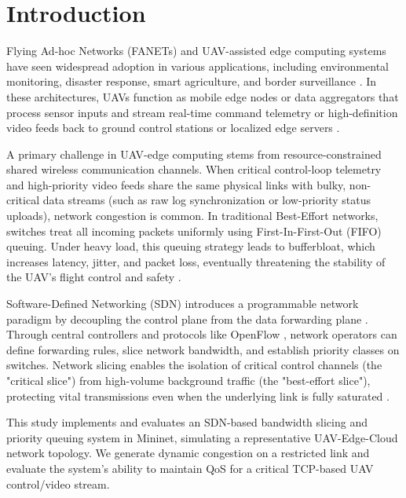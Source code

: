 \documentclass[conference]{IEEEtran}
\begin{document}
\section{Introduction}
Flying Ad-hoc Networks (FANETs) and UAV-assisted edge computing systems have seen widespread adoption in various applications, including environmental monitoring, disaster response, smart agriculture, and border surveillance \cite{b7}. In these architectures, UAVs function as mobile edge nodes or data aggregators that process sensor inputs and stream real-time command telemetry or high-definition video feeds back to ground control stations or localized edge servers \cite{b8}.

A primary challenge in UAV-edge computing stems from resource-constrained shared wireless communication channels. When critical control-loop telemetry and high-priority video feeds share the same physical links with bulky, non-critical data streams (such as raw log synchronization or low-priority status uploads), network congestion is common. In traditional Best-Effort networks, switches treat all incoming packets uniformly using First-In-First-Out (FIFO) queuing. Under heavy load, this queuing strategy leads to bufferbloat, which increases latency, jitter, and packet loss, eventually threatening the stability of the UAV's flight control and safety \cite{b1}.

Software-Defined Networking (SDN) introduces a programmable network paradigm by decoupling the control plane from the data forwarding plane \cite{b2}. Through central controllers and protocols like OpenFlow \cite{b9}, network operators can define forwarding rules, slice network bandwidth, and establish priority classes on switches. Network slicing enables the isolation of critical control channels (the "critical slice") from high-volume background traffic (the "best-effort slice"), protecting vital transmissions even when the underlying link is fully saturated \cite{b10}.

This study implements and evaluates an SDN-based bandwidth slicing and priority queuing system in Mininet, simulating a representative UAV-Edge-Cloud network topology. We generate dynamic congestion on a restricted link and evaluate the system's ability to maintain QoS for a critical TCP-based UAV control/video stream.
\end{document}
